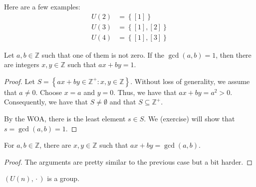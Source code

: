\begin{nexample}
    Here are a few examples:
    \[
    \begin{aligned}
        U(2) &= \left\{[1]\right\} \\
        U(3) &= \left\{[1], [2]\right\} \\
        U(4) &= \left\{[1], [3]\right\}
    \end{aligned}
    \]
\end{nexample}

\begin{theorem}
    Let \(a, b \in \mathbb{Z}\) such that one of them is not zero. If the \(\gcd(a, b) = 1\), then there are integers \(x, y \in \mathbb{Z}\) such that \(ax + by = 1\).
\end{theorem}

\begin{proof}
    Let \(S = \left\{ax + by \in \mathbb{Z}^+ : x, y \in \mathbb{Z}\right\}\). Without loss of generality, we assume that \(a \neq 0\). Choose \(x = a\) and \(y = 0\). Thus, we have that \(ax + by = a^2 > 0\). Consequently, we have that \(S \neq \emptyset\) and that \(S \subseteq \mathbb{Z}^+\).

    By the WOA, there is the least element \(s \in S\). We (exercise) will show that \(s = \gcd(a, b) = 1\).
\end{proof}

\begin{theorem}
    For \(a, b \in \mathbb{Z}\), there are \(x, y \in \mathbb{Z}\) such that \(ax + by = \gcd(a, b)\).
\end{theorem}

\begin{proof}
    The arguments are pretty similar to the previous case but a bit harder.
\end{proof}

\begin{claim}
    \((U(n), {}\cdot{})\) is a group.
\end{claim}

